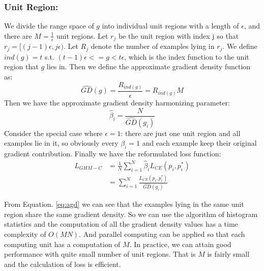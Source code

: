 \documentclass[letterpaper]{article} \usepackage{aaai19}  \usepackage{times}  \usepackage{helvet}  \usepackage{courier}  \usepackage{url}  \usepackage{graphicx}  \usepackage{amsmath,amssymb}
\begin{document}
\subsubsection{Unit Region:} We divide the range space of $g$ into individual unit regions with a length of $\epsilon$, and there are $M = \frac{1}{\epsilon}$ unit regions. Let $r_j$ be the unit region with index j so that $r_j = [(j-1)\epsilon, j\epsilon)$. Let $R_j$ denote the number of examples lying in $r_j$. We define $ind(g) = t$ s.t. $(t-1)\epsilon <= g < t\epsilon$, which is the index function to the unit region that $g$ lies in. Then we define the approximate gradient density function as:
\begin{equation}
\label{eq:agd}
  \hat{GD}(g) = \frac{R_{ind(g)}}{\epsilon} = R_{ind(g)}M
\end{equation}
Then we have the approximate gradient density harmonizing parameter:
\begin{equation}
\label{eq:abeta}
  \hat{\beta}_i = \frac{N}{\hat{GD}(g_i)}
\end{equation}
Consider the special case where $\epsilon = 1$: there are just one unit region and all examples lie in it, so obviously every $\beta_i = 1$ and each example keep their original gradient contribution.
Finally we have the reformulated loss function:
\begin{equation}
\label{eq:alghm}
  \begin{aligned}
    \hat{L}_{GHM-C} &= \frac{1}{N}\sum_{i=1}^N\hat{\beta}_i L_{CE}(p_i, p_i^*) \\
    &= \sum_{i=1}^N\frac{L_{CE}(p_i, p_i^*)}{\hat{GD}(g_i)} 
    \end{aligned} 
\end{equation}

From Equation. \ref{eq:agd} we can see that the examples lying in the same unit region share the same gradient density. So we can use the algorithm of histogram statistics and the computation of all the gradient density values has a time complexity of $O(MN)$. And parallel computing can be applied so that each computing unit has a computation of $M$. In practice, we can attain good performance with quite small number of unit regions. That is $M$ is fairly small and the calculation of loss is efficient.
\end{document}
